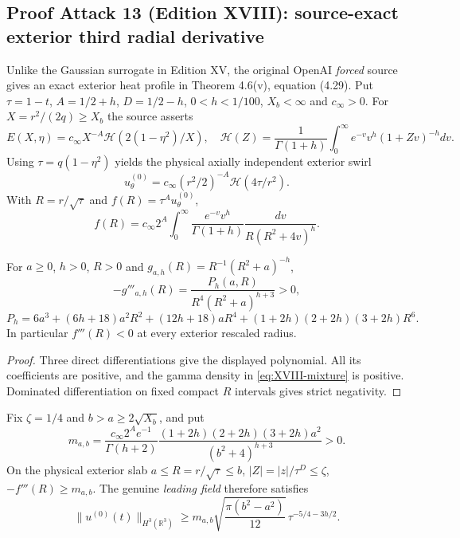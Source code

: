\subsection*{Proof Attack 13 (Edition XVIII): source-exact exterior third radial derivative}
\label{subsec:editionXVIII-exterior-derivative}
Unlike the Gaussian surrogate in Edition XV, the original OpenAI
\emph{forced} source gives an exact exterior heat profile in
Theorem 4.6(v), equation (4.29). Put $\tau=1-t$,
$A=1/2+h$, $D=1/2-h$, $0<h<1/100$, $X_b<\infty$ and $c_\infty>0$.
For $X=r^2/(2q)\ge X_b$ the source asserts
\[
E(X,\eta)=c_\infty X^{-A}\mathcal H(2(1-\eta^2)/X),\quad
\mathcal H(Z)=\frac1{\Gamma(1+h)}
\int_0^\infty e^{-v}v^h(1+Zv)^{-h}dv.
\]
Using $\tau=q(1-\eta^2)$ yields the physical axially independent
exterior swirl
\[
u_\theta^{(0)}=c_\infty(r^2/2)^{-A}\mathcal H(4\tau/r^2).
\]
With $R=r/\sqrt\tau$ and $f(R)=\tau^Au_\theta^{(0)}$,
\begin{equation}\label{eq:XVIII-mixture}
\boxed{ f(R)=c_\infty2^A\int_0^\infty
\frac{e^{-v}v^h}{\Gamma(1+h)}
\frac{dv}{R(R^2+4v)^h}. }
\end{equation}
\begin{proposition}
For $a\ge0$, $h>0$, $R>0$ and $g_{a,h}(R)=R^{-1}(R^2+a)^{-h}$,
\[
-g'''_{a,h}(R)=\frac{P_h(a,R)}{R^4(R^2+a)^{h+3}}>0,
\]
\[
P_h=6a^3+(6h+18)a^2R^2+(12h+18)aR^4+
(1+2h)(2+2h)(3+2h)R^6.
\]
In particular $f'''(R)<0$ at every exterior rescaled radius.
\end{proposition}
\begin{proof}
Three direct differentiations give the displayed polynomial.
All its coefficients are positive, and the gamma density in
\eqref{eq:XVIII-mixture} is positive. Dominated differentiation
on fixed compact $R$ intervals gives strict negativity.
\end{proof}
\begin{proposition}
Fix $\zeta=1/4$ and $b>a\ge2\sqrt{X_b}$, and put
\[
m_{a,b}=
\frac{c_\infty2^Ae^{-1}}{\Gamma(h+2)}
\frac{(1+2h)(2+2h)(3+2h)a^2}{(b^2+4)^{h+3}}>0.
\]
On the physical exterior slab
$a\le R=r/\sqrt\tau\le b$,
$|Z|=|z|/\tau^D\le\zeta$,
$-f'''(R)\ge m_{a,b}$. The genuine \emph{leading field}
therefore satisfies
\begin{equation}\label{eq:XVIII-source-H3-lower}
\boxed{\|u^{(0)}(t)\|_{H^3(\mathbb R^3)}
\ge m_{a,b}\sqrt{\frac{\pi(b^2-a^2)}{12}}\,
\tau^{-5/4-3h/2}.}
\end{equation}
\end{proposition}
